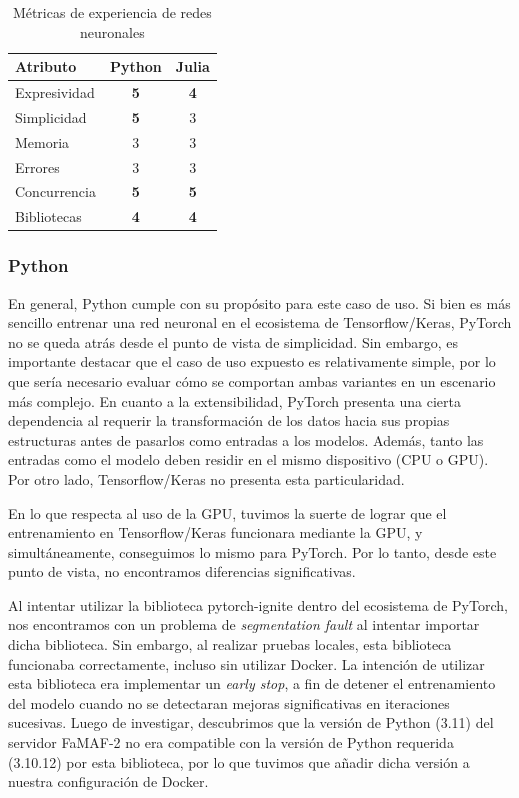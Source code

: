 \documentclass[11pt]{article}
\let\Oldsubsubsection\subsubsection
\renewcommand{\subsubsection}{\FloatBarrier\Oldsubsubsection}
\newcommand{\goodMetric}[1]{{\textbf{#1}}}
\newcommand{\english}[1]{\textit{#1}}
\begin{document}
\begin{table}[h]
\centering
\begin{tabular}{|l|cc|}
\hline
Atributo & \multicolumn{1}{c|}{Python} & Julia \\ \hline
Expresividad & \multicolumn{1}{c|}{\goodMetric{5}} & \goodMetric{4} \\ \hline
Simplicidad & \multicolumn{1}{c|}{\goodMetric{5}} & 3 \\ \hline
Memoria & \multicolumn{1}{c|}{3} & 3 \\ \hline
Errores & \multicolumn{1}{c|}{3} & 3 \\ \hline
Concurrencia & \multicolumn{1}{c|}{\goodMetric{5}} & \goodMetric{5} \\ \hline
Bibliotecas & \multicolumn{1}{c|}{\goodMetric{4}} & \goodMetric{4} \\ \hline
\end{tabular}
\caption{Métricas de experiencia de redes neuronales}
\label{tab:nn:experiences}
\end{table}

\subsubsection{Python}

En general, Python cumple con su propósito para este caso de uso. Si bien es más sencillo entrenar una red neuronal en el ecosistema de Tensorflow/Keras, PyTorch no se queda atrás desde el punto de vista de simplicidad. Sin embargo, es importante destacar que el caso de uso expuesto es relativamente simple, por lo que sería necesario evaluar cómo se comportan ambas variantes en un escenario más complejo. En cuanto a la extensibilidad, PyTorch presenta una cierta dependencia al requerir la transformación de los datos hacia sus propias estructuras antes de pasarlos como entradas a los modelos. Además, tanto las entradas como el modelo deben residir en el mismo dispositivo (CPU o GPU). Por otro lado, Tensorflow/Keras no presenta esta particularidad.

En lo que respecta al uso de la GPU, tuvimos la suerte de lograr que el entrenamiento en Tensorflow/Keras funcionara mediante la GPU, y simultáneamente, conseguimos lo mismo para PyTorch. Por lo tanto, desde este punto de vista, no encontramos diferencias significativas.

Al intentar utilizar la biblioteca pytorch-ignite dentro del ecosistema de PyTorch, nos encontramos con un problema de \english{segmentation fault} al intentar importar dicha biblioteca. Sin embargo, al realizar pruebas locales, esta biblioteca funcionaba correctamente, incluso sin utilizar Docker. La intención de utilizar esta biblioteca era implementar un \english{early stop}, a fin de detener el entrenamiento del modelo cuando no se detectaran mejoras significativas en iteraciones sucesivas. Luego de investigar, descubrimos que la versión de Python (3.11) del servidor FaMAF-2 no era compatible con la versión de Python requerida (3.10.12) por esta biblioteca, por lo que tuvimos que añadir dicha versión a nuestra configuración de Docker.
\end{document}
